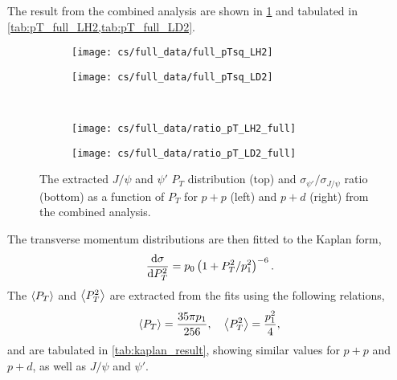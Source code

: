 \documentclass[../main.tex]{subfiles}
\begin{document}
The result from the combined analysis are shown in \cref{fig:pT_combined} and tabulated in \cref{tab:pT_full_LH2,tab:pT_full_LD2}.
\begin{figure}[h!]
	\centering
	\begin{subfigure}{0.48\linewidth}
		\texttt{[image: cs/full\_data/full\_pTsq\_LH2]}
	\end{subfigure}
	\begin{subfigure}{0.48\linewidth}
		\texttt{[image: cs/full\_data/full\_pTsq\_LD2]}
	\end{subfigure}
	\\
	\begin{subfigure}{0.48\linewidth}
		\texttt{[image: cs/full\_data/ratio\_pT\_LH2\_full]}
	\end{subfigure}
	\begin{subfigure}{0.48\linewidth}
		\texttt{[image: cs/full\_data/ratio\_pT\_LD2\_full]}
	\end{subfigure}
	\caption{The extracted $J/\psi$ and $\psi'$ $P_T$ distribution (top) and $\sigma_{\psi'}/\sigma_{J/\psi}$
		ratio (bottom) as a function of $P_T$ for $p+p$ (left) and $p+d$ (right) from
		the combined analysis.}
	\label{fig:pT_combined}
\end{figure}
\begin{table}[h!]
	\centering
	\caption{Cross section $d\sigma/dP^2_T$ (in \unit{\nano\barn\GeV^{-2} nucleon^{-1}}) and the
		$\sigma_{\psi'}/\sigma_{J/\psi}$ ratio for $p+p$ extracted from the combined analysis, with
		their statistical and systematic uncertainties and the $\expval{P_T}$ (in \unit{\GeV}) in each bin.}
	
	\label{tab:pT_full_LH2}
\end{table}
\begin{table}[h!]
	\centering
	\caption{Cross section $d\sigma/dP^2_T$ (in \unit{\nano\barn\GeV^{-2} nucleon^{-1}}) and the
		$\sigma_{\psi'}/\sigma_{J/\psi}$ ratio for $p+d$ extracted from the combined analysis, with
		their statistical and systematic uncertainties and the $\expval{P_T}$ (in \unit{\GeV}) in each bin.}
	
	\label{tab:pT_full_LD2}
\end{table}
The transverse momentum distributions are then fitted to the Kaplan form, 
\begin{equation}
	\dv{\sigma}{P_T^2} =p_0 \left(1+ P_T^2/p_1^2\right)^{-6}.
	\label{eq:4_2_kaplan}
\end{equation}
The $\expval{P_T}$ and $\expval{P^2_T}$ are extracted from the fits using the following relations,
\begin{equation}
	\begin{split}
		\expval{P_T} = \frac{35\pi p_1}{256}, \quad \expval{P_T^2} = \frac{p_1^2}{4},
	\end{split}
\end{equation}
and are tabulated in \cref{tab:kaplan_result}, showing similar values for $p+p$ and $p+d$,
as well as $J/\psi$ and $\psi'$.
\end{document}
